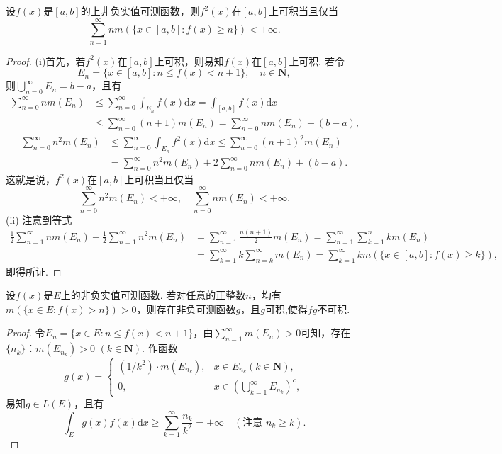 \documentclass[../../main.tex]{subfiles}
\begin{document}
\begin{example}
设\(f(x)\)是\([a, b]\)的上非负实值可测函数，则\(f^2(x)\)在\([a, b]\)上可积当且仅当
\[
\sum_{n = 1}^{\infty} n m(\{x \in [a, b]: f(x) \geqslant n\}) < +\infty.
\]
\end{example}
\begin{proof}
(i)首先，若\(f^2(x)\)在\([a, b]\)上可积，则易知\(f(x)\)在\([a, b]\)上可积. 若令
\[
E_n = \{x \in [a, b]: n \leqslant f(x) < n + 1\}, \quad n \in \mathbf{N},
\]
则\(\bigcup_{n = 0}^{\infty} E_n = b - a\)，且有
\begin{align*}
\sum_{n = 0}^{\infty} n m(E_n) &\leqslant \sum_{n = 0}^{\infty} \int_{E_n} f(x) \mathrm{d}x = \int_{[a, b]} f(x) \mathrm{d}x \\
&\leqslant \sum_{n = 0}^{\infty} (n + 1)m(E_n) = \sum_{n = 0}^{\infty} n m(E_n) + (b - a),
\end{align*}
\begin{align*}
\sum_{n = 0}^{\infty} n^2 m(E_n) &\leqslant \sum_{n = 0}^{\infty} \int_{E_n} f^2(x) \mathrm{d}x \leqslant \sum_{n = 0}^{\infty} (n + 1)^2 m(E_n) \\
&= \sum_{n = 0}^{\infty} n^2 m(E_n) + 2 \sum_{n = 0}^{\infty} n m(E_n) + (b - a).
\end{align*}
这就是说，\(f^2(x)\)在\([a, b]\)上可积当且仅当
\[
\sum_{n = 0}^{\infty} n^2 m(E_n) < +\infty, \quad \sum_{n = 0}^{\infty} n m(E_n) < +\infty.
\]
(ii) 注意到等式
\begin{align*}
\frac{1}{2} \sum_{n = 1}^{\infty} n m(E_n) + \frac{1}{2} \sum_{n = 1}^{\infty} n^2 m(E_n) 
&= \sum_{n = 1}^{\infty} \frac{n(n + 1)}{2} m(E_n) = \sum_{n = 1}^{\infty} \sum_{k = 1}^{n} k m(E_n) \\
&= \sum_{k = 1}^{\infty} k \sum_{n = k}^{\infty} m(E_n) = \sum_{k = 1}^{\infty} k m(\{x \in [a, b]: f(x) \geqslant k\}),
\end{align*}
即得所证.
\end{proof}

\begin{proposition}\label{proposition:4.1例7}
设\(f(x)\)是\(E\)上的非负实值可测函数. 若对任意的正整数\(n\)，均有\(m(\{x \in E: f(x)>n\})>0\)，则存在非负可测函数\(g\)，且$g$可积,使得\(fg\)不可积.
\end{proposition}
\begin{proof}
令\(E_n = \{x \in E: n \leqslant f(x) < n + 1\}\)，由\(\sum_{n = 1}^{\infty} m(E_n) > 0\)可知，存在\(\{n_k\}\)：\(m(E_{n_k})>0\) \((k \in \mathbf{N})\). 作函数
\[
g(x)=
\begin{cases}
(1 / k^2) \cdot m(E_{n_k}), & x \in E_{n_k} (k \in \mathbf{N}), \\
0, & x \in \left(\bigcup_{k = 1}^{\infty} E_{n_k}\right)^c,
\end{cases}
\]
易知\(g \in L(E)\)，且有
\[
\int_E g(x) f(x) \mathrm{d}x \geqslant \sum_{k = 1}^{\infty} \frac{n_k}{k^2} = +\infty \quad (\text{注意 } n_k \geqslant k).
\] 
\end{proof}
\end{document}
